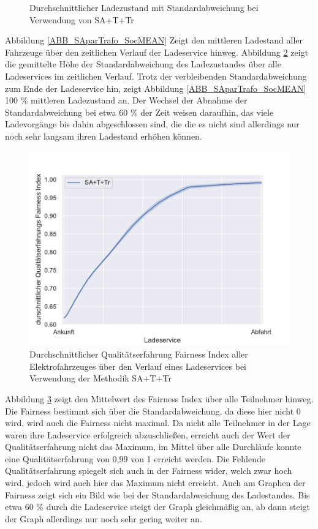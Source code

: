 \begin{figure}
\begin{subfigure}{0.49\linewidth}
        \label{ABB_SAparTrafo_SocSTD}
	\end{subfigure}
	\caption{Durchschnittlicher Ladezustand mit Standardabweichung bei Verwendung von SA+T+Tr}
\end{figure}
Abbildung \ref{ABB_SAparTrafo_SocMEAN} Zeigt den mittleren Ladestand aller Fahrzeuge über den zeitlichen Verlauf der Ladeservice hinweg. Abbildung \ref{ABB_SAparTrafo_SocSTD} zeigt die gemittelte Höhe der Standardabweichung des Ladezustandes über alle Ladeservices im zeitlichen Verlauf. Trotz der verbleibenden Standardabweichung zum Ende der Ladeservice hin, zeigt Abbildung \ref{ABB_SAparTrafo_SocMEAN} 100 \% mittleren Ladezustand an. Der Wechsel der  Abnahme der Standardabweichung bei etwa 60 \% der Zeit weisen daraufhin, das viele Ladevorgänge bis dahin abgeschlossen sind, die die es nicht sind allerdings nur noch sehr langsam ihren Ladestand erhöhen können. \\
\begin{figure}[htb]
\centering
	\includegraphics[scale=0.45]{img/Sa_par_trafo/SlottedAloha_participants_VDE_tau_trafo_15_qoe.pdf}
	\caption{Durchschnittlicher Qualitätserfahrung Fairness Index aller Elektrofahrzeuges über den Verlauf eines Ladeservices bei Verwendung der Methodik SA+T+Tr}
	\label{Abb_SAparTrafo_Fairness}
\end{figure}
Abbildung \ref{Abb_SAparTrafo_Fairness} zeigt den Mittelwert des Fairness Index über alle Teilnehmer hinweg. Die Fairness bestimmt sich über die Standardabweichung, da diese hier nicht 0 wird, wird auch die Fairness nicht maximal. Da nicht alle Teilnehmer in der Lage waren ihre Ladeservice erfolgreich abzuschließen, erreicht auch der Wert der Qualitätserfahrung nicht das Maximum, im Mittel über alle Durchläufe konnte eine Qualitätserfahrung von 0,99 von 1 erreicht werden. Die Fehlende Qualitätserfahrung spiegelt sich auch in der Fairness wider, welch zwar hoch wird, jedoch wird auch hier das Maximum nicht erreicht. Auch am Graphen der Fairness zeigt sich ein Bild wie bei der Standardabweichung des Ladestandes. Bis etwa 60 \% durch die Ladeservice steigt der Graph gleichmäßig an, ab dann steigt der Graph allerdings nur noch sehr gering weiter an. 

